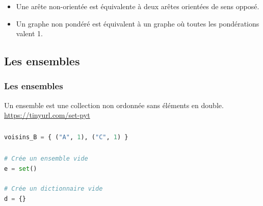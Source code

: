 \documentclass[svgnames,11pt]{beamer}
\begin{document}
\begin{frame}
    \frametitle{}

    \begin{itemize}
        \item Une arête non-orientée est équivalente à deux arêtes orientées de sens opposé.
        \item Un graphe non pondéré est équivalent à un graphe où toutes les pondérations valent 1.
    \end{itemize}

\end{frame}
\subsection{Les ensembles}
\begin{frame}
    \frametitle{Les ensembles}
\begin{aretenir}[]
    Un ensemble est une collection non ordonnée sans éléments en double. \url{https://tinyurl.com/set-pyt}
\end{aretenir}
    

\end{frame}
\begin{frame}[fragile]
    \frametitle{}

    \begin{center}
    \end{center}
    \begin{center}
    \begin{lstlisting}[language=Python , basicstyle=\ttfamily\small, xleftmargin=2em, xrightmargin=2em]
voisins_B = { ("A", 1), ("C", 1) }
\end{lstlisting}
    \label{CODE}
    \end{center}
\end{frame}
\begin{frame}[fragile]
    \frametitle{}

    
\begin{aretenir}[Remarque]
\begin{center}
\begin{lstlisting}[language=Python , basicstyle=\ttfamily\small, xleftmargin=2em, xrightmargin=2em]
# Crée un ensemble vide
e = set()

# Crée un dictionnaire vide
d = {}
\end{lstlisting}
\end{center}
\end{aretenir}

\end{frame}
\end{document}
